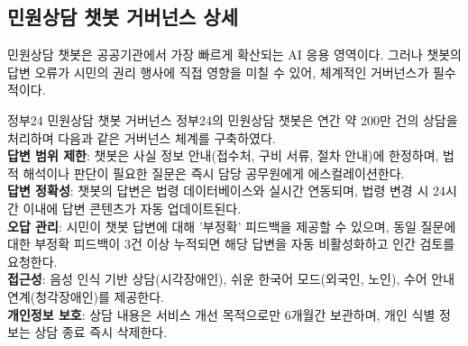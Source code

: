 \subsection{민원상담 챗봇 거버넌스 상세}

민원상담 챗봇은 공공기관에서 가장 빠르게 확산되는 AI 응용 영역이다. 그러나 챗봇의 답변 오류가 시민의 권리 행사에 직접 영향을 미칠 수 있어, 체계적인 거버넌스가 필수적이다.

\begin{practicaltool}{정부24 민원상담 챗봇 거버넌스}
정부24의 민원상담 챗봇은 연간 약 200만 건의 상담을 처리하며 다음과 같은 거버넌스 체계를 구축하였다.\\
\textbf{답변 범위 제한}: 챗봇은 사실 정보 안내(접수처, 구비 서류, 절차 안내)에 한정하며, 법적 해석이나 판단이 필요한 질문은 즉시 담당 공무원에게 에스컬레이션한다.\\
\textbf{답변 정확성}: 챗봇의 답변은 법령 데이터베이스와 실시간 연동되며, 법령 변경 시 24시간 이내에 답변 콘텐츠가 자동 업데이트된다.\\
\textbf{오답 관리}: 시민이 챗봇 답변에 대해 '부정확' 피드백을 제공할 수 있으며, 동일 질문에 대한 부정확 피드백이 3건 이상 누적되면 해당 답변을 자동 비활성화하고 인간 검토를 요청한다.\\
\textbf{접근성}: 음성 인식 기반 상담(시각장애인), 쉬운 한국어 모드(외국인, 노인), 수어 안내 연계(청각장애인)를 제공한다.\\
\textbf{개인정보 보호}: 상담 내용은 서비스 개선 목적으로만 6개월간 보관하며, 개인 식별 정보는 상담 종료 즉시 삭제한다.
\end{practicaltool}

